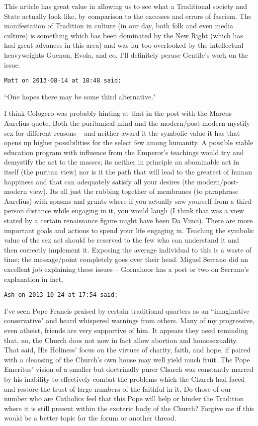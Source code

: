 \begin{footnotesize}
\begin{sffamily}
This article has great value in allowing us to see what a Traditional society and State actually look like, by comparison to the excesses and errors of fascism. The manifestation of Tradition in culture (in our day, both folk and even media culture) is something which has been dominated by the New Right (which has had great advances in this area) and was far too overlooked by the intellectual heavyweights Guenon, Evola, and co. I'll definitely peruse Gentile's work on the issue.


\hfill

\texttt{Matt on 2013-08-14 at 18:48 said: }

``One hopes there may be some third alternative."

I think Cologero was probably hinting at that in the post with the Marcus Aurelius quote. Both the puritanical mind and the modern/post-modern mystify sex for different reasons – and neither award it the symbolic value it has that opens up higher possibilities for the select few among humanity. A possible viable education program with influence from the Emperor's teachings would try and demystify the act to the masses; its neither in principle an abominable act in itself (the puritan view) nor is it the path that will lead to the greatest of human happiness and that can adequately satisfy all your desires (the modern/post-modern view). Its all just the rubbing together of membranes (to paraphrase Aurelius) with spasms and grunts where if you actually saw yourself from a third-person distance while engaging in it, you would laugh (I think that was a view stated by a certain renaissance figure might have been Da Vinci). There are more important goals and actions to spend your life engaging in. Teaching the symbolic value of the sex act should be reserved to the few who can understand it and then correctly implement it. Exposing the average individual to this is a waste of time; the message/point completely goes over their head. Miguel Serrano did an excellent job explaining these issues – Gornahoor has a post or two on Serrano's explanation in fact.


\hfill

\texttt{Ash on 2013-10-24 at 17:54 said: }

I've seen Pope Francis praised by certain traditional quarters as an ``imaginative conservative" and heard whispered warnings from others. Many of my progressive, even atheist, friends are very supportive of him. It appears they need reminding that, no, the Church does not now in fact allow abortion and homosexuality. That said, His Holiness' focus on the virtues of charity, faith, and hope, if paired with a cleansing of the Church's own house may well yield much fruit. The Pope Emeritus' vision of a smaller but doctrinally purer Church was constantly marred by his inability to effectively combat the problems which the Church had faced and restore the trust of large numbers of the faithful in it. Do those of our number who are Catholics feel that this Pope will help or hinder the Tradition where it is still present within the exoteric body of the Church? Forgive me if this would be a better topic for the forum or another thread. 


\end{sffamily}
\end{footnotesize}
